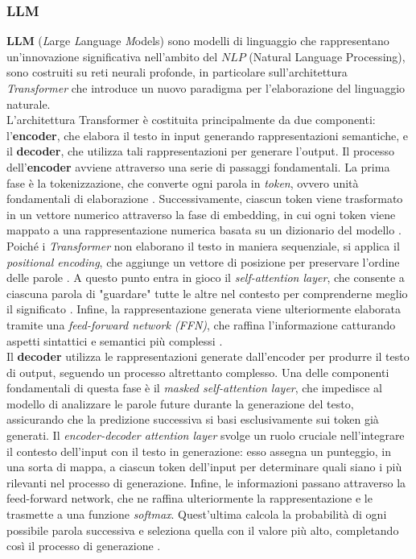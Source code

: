 \documentclass{article}
\begin{document}
\subsubsection{LLM} 
\textbf{LLM} (\textit{L}arge \textit{L}anguage \textit{M}odels) sono modelli di linguaggio che rappresentano un'innovazione significativa nell'ambito del \(NLP\) (Natural Language Processing), sono costruiti su reti neurali profonde\cite{di2025use}, in particolare sull'architettura \textit{Transformer}\cite{vaswani2017attention}  che introduce un nuovo paradigma per l'elaborazione del linguaggio naturale.\\ 
L'architettura Transformer è costituita principalmente da due componenti: l'\textbf{encoder}, che elabora il testo in input generando rappresentazioni semantiche, e il \textbf{decoder}, che utilizza tali rappresentazioni per generare l'output. Il processo dell'\textbf{encoder} avviene attraverso una serie di passaggi fondamentali. La prima fase è la tokenizzazione, che converte ogni parola in \textit{token}, ovvero unità fondamentali di elaborazione \cite{huggingface_transformers_tokenizer}. Successivamente, ciascun token viene trasformato in un vettore numerico attraverso la fase di embedding, in cui ogni token viene mappato a una rappresentazione numerica basata su un dizionario del modello \cite{devlin2019bertpretrainingdeepbidirectional}. Poiché i \textit{Transformer} non elaborano il testo in maniera sequenziale, si applica il \textit{positional encoding}, che aggiunge un vettore di posizione per preservare l'ordine delle parole \cite{vaswani2017attention}. A questo punto entra in gioco il \textit{self-attention layer}, che consente a ciascuna parola di "guardare" tutte le altre nel contesto per comprenderne meglio il significato \cite{vaswani2017attention}. Infine, la rappresentazione generata viene ulteriormente elaborata tramite una \textit{feed-forward network (FFN)}, che raffina l'informazione catturando aspetti sintattici e semantici più complessi \cite{vaswani2017attention}.\\
Il \textbf{decoder} utilizza le rappresentazioni generate dall’encoder per produrre il testo di output, seguendo un processo altrettanto complesso. Una delle componenti fondamentali di questa fase è il \textit{masked self-attention layer}, che impedisce al modello di analizzare le parole future durante la generazione del testo, assicurando che la predizione successiva si basi esclusivamente sui token già generati. Il \textit{encoder-decoder attention layer} svolge un ruolo cruciale nell'integrare il contesto dell’input con il testo in generazione: esso assegna un punteggio, in una sorta di mappa, a ciascun token dell'input per determinare quali siano i più rilevanti nel processo di generazione. Infine, le informazioni passano attraverso la feed-forward network, che ne raffina ulteriormente la rappresentazione e le trasmette a una funzione \textit{softmax}. Quest'ultima calcola la probabilità di ogni possibile parola successiva e seleziona quella con il valore più alto, completando così il processo di generazione \cite{vaswani2017attention}.
\end{document}
